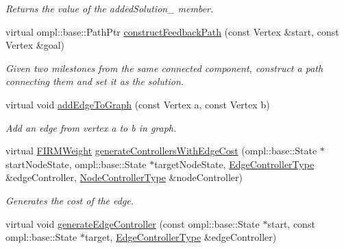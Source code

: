 \begin{DoxyCompactItemize}
\begin{DoxyCompactList}\small\item\em \-Returns the value of the added\-Solution\-\_\- member. \end{DoxyCompactList}\item 
virtual ompl\-::base\-::\-Path\-Ptr \hyperlink{class_f_i_r_m_a28ff922dfb8df66dbb82a6b6078959a0}{construct\-Feedback\-Path} (const \-Vertex \&start, const \-Vertex \&goal)
\begin{DoxyCompactList}\small\item\em \-Given two milestones from the same connected component, construct a path connecting them and set it as the solution. \end{DoxyCompactList}\item 
\hypertarget{class_f_i_r_m_a9774dc171985f4521c02b5db8552397f}{virtual void \hyperlink{class_f_i_r_m_a9774dc171985f4521c02b5db8552397f}{add\-Edge\-To\-Graph} (const \-Vertex a, const \-Vertex b)}\label{class_f_i_r_m_a9774dc171985f4521c02b5db8552397f}

\begin{DoxyCompactList}\small\item\em \-Add an edge from vertex a to b in graph. \end{DoxyCompactList}\item 
\hypertarget{class_f_i_r_m_acb96d1cd6665cf4da65a41f580932103}{virtual \hyperlink{class_f_i_r_m_weight}{\-F\-I\-R\-M\-Weight} \hyperlink{class_f_i_r_m_acb96d1cd6665cf4da65a41f580932103}{generate\-Controllers\-With\-Edge\-Cost} (ompl\-::base\-::\-State $\ast$start\-Node\-State, ompl\-::base\-::\-State $\ast$target\-Node\-State, \hyperlink{class_f_i_r_m_a70abcb24fbc9f836b94119f65c8f8a37}{\-Edge\-Controller\-Type} \&edge\-Controller, \hyperlink{class_controller}{\-Node\-Controller\-Type} \&node\-Controller)}\label{class_f_i_r_m_acb96d1cd6665cf4da65a41f580932103}

\begin{DoxyCompactList}\small\item\em \-Generates the cost of the edge. \end{DoxyCompactList}\item 
\hypertarget{class_f_i_r_m_abfccb43f41872b8da9a4609c1748d21f}{virtual void \hyperlink{class_f_i_r_m_abfccb43f41872b8da9a4609c1748d21f}{generate\-Edge\-Controller} (const ompl\-::base\-::\-State $\ast$start, const ompl\-::base\-::\-State $\ast$target, \hyperlink{class_f_i_r_m_a70abcb24fbc9f836b94119f65c8f8a37}{\-Edge\-Controller\-Type} \&edge\-Controller)}\label{class_f_i_r_m_abfccb43f41872b8da9a4609c1748d21f}


\end{DoxyCompactItemize}
